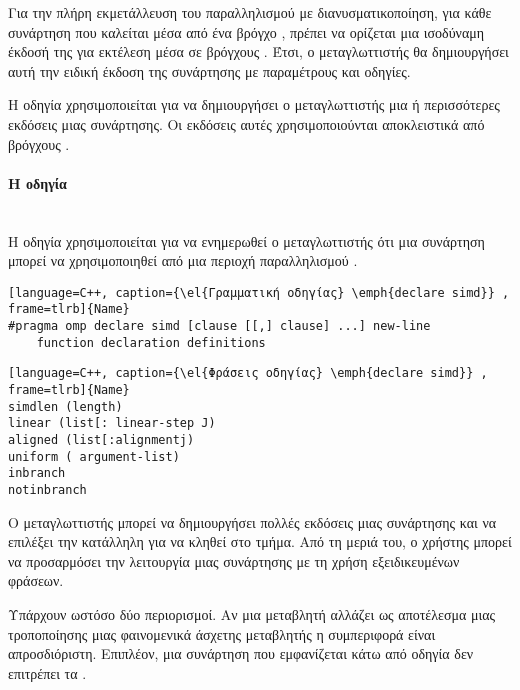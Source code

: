 Για την πλήρη εκμετάλλευση του παραλληλισμού με διανυσματικοποίηση, για κάθε συνάρτηση που καλείται μέσα από ένα βρόγχο
\emph{}, πρέπει να ορίζεται μια ισοδύναμη έκδοσή της για εκτέλεση μέσα σε βρόγχους \emph{}. Έτσι, ο
μεταγλωττιστής θα δημιουργήσει αυτή την ειδική έκδοση της συνάρτησης με \emph{} παραμέτρους και οδηγίες.

Η οδηγία \emph{} χρησιμοποιείται για να δημιουργήσει ο μεταγλωττιστής μια ή περισσότερες εκδόσεις μιας
συνάρτησης. Οι εκδόσεις αυτές χρησιμοποιούνται αποκλειστικά από βρόγχους \emph{}.


\paragraph{H οδηγία \emph{}}
\ \\
Η οδηγία \emph{} χρησιμοποιείται για να ενημερωθεί ο μεταγλωττιστής ότι μια συνάρτηση μπορεί να
χρησιμοποιηθεί από μια περιοχή παραλληλισμού \emph{}.

\begin{spacing}{1.1}
\begin{lstlisting}[language=C++, caption={\el{Γραμματική οδηγίας} \emph{declare simd}} , frame=tlrb]{Name}
#pragma omp declare simd [clause [[,] clause] ...] new-line
	function declaration definitions
\end{lstlisting}

\begin{lstlisting}[language=C++, caption={\el{Φράσεις οδηγίας} \emph{declare simd}} , frame=tlrb]{Name}
simdlen (length)
linear (list[: linear-step J)
aligned (list[:alignmentj)
uniform ( argument-list)
inbranch
notinbranch
\end{lstlisting}
\end{spacing}

Ο μεταγλωττιστής μπορεί να δημιουργήσει πολλές \emph{} εκδόσεις  μιας συνάρτησης και να επιλέξει την κατάλληλη
για να κληθεί στο \emph{} τμήμα. Από τη μεριά του, ο χρήστης μπορεί να
προσαρμόσει την λειτουργία μιας συνάρτησης με τη χρήση εξειδικευμένων φράσεων.

Υπάρχουν ωστόσο δύο περιορισμοί. Αν μια μεταβλητή αλλάζει ως αποτέλεσμα μιας τροποποίησης μιας φαινομενικά άσχετης
μεταβλητής η συμπεριφορά είναι απροσδιόριστη. Επιπλέον, μια συνάρτηση που εμφανίζεται κάτω από οδηγία \emph{} δεν επιτρέπει τα \emph{}.

